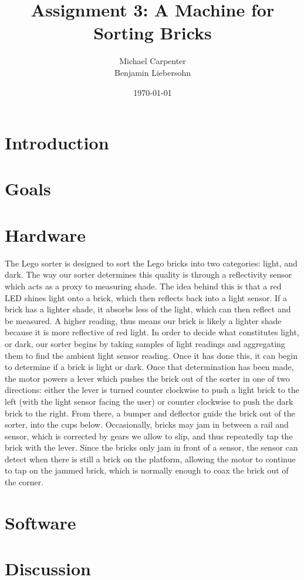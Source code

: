 \documentclass{article}
\title{Assignment 3: A Machine for Sorting Bricks}
\author{Michael Carpenter \\ Benjamin Liebersohn}
\date{\today}
\begin{document}
\maketitle

\section{Introduction}

\section{Goals}

\section{Hardware}
The Lego sorter is designed to sort the Lego bricks into two categories: light, and dark. The way our sorter determines this quality is through a reflectivity sensor which acts as a proxy to measuring shade. The idea behind this is that a red LED shines light onto a brick, which then reflects back into a light sensor. If a brick has a lighter shade, it absorbs less of the light, which can then reflect and be measured. A higher reading, thus means our brick is likely a lighter shade because it is more reflective of red light. In order to decide what constitutes light, or dark, our sorter begins by taking samples of light readings and aggregating them to find the ambient light sensor reading. Once it has done this, it can begin to determine if a brick is light or dark. Once that determination has been made, the motor powers a lever which pushes the brick out of the sorter in one of two directions: either the lever is turned counter clockwise to push a light brick to the left (with the light sensor facing the user) or counter clockwise to push the dark brick to the right. From there, a bumper and deflector guide the brick out of the sorter, into the cups below. Occasionally, bricks may jam in between a rail and sensor, which is corrected by gears we allow to slip, and thus repeatedly tap the brick with the lever. Since the bricks only jam in front of a sensor, the sensor can detect when there is still a brick on the platform, allowing the motor to continue to tap on the jammed brick, which is normally enough to coax the brick out of the corner.
\section{Software}

\section{Discussion}
\end{document}
